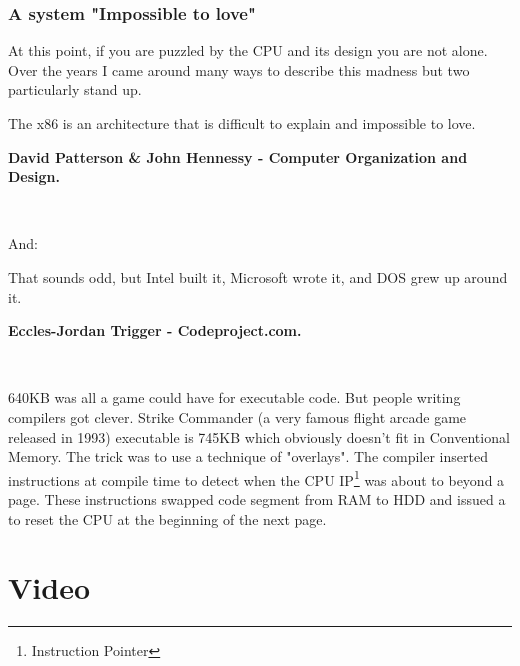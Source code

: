 \documentclass[book.tex]{subfiles}
\begin{document}
\subsubsection{A system "Impossible to love"}
At this point, if you are puzzled by the CPU and its design you are not alone. Over the years I came around many ways to describe this madness but two particularly stand up.\\
\par
 \begin{fancyquotes}
   The x86 is an architecture that is difficult to explain and impossible to love.\\
   \par
\textbf{David Patterson \& John Hennessy - Computer Organization and Design.}
 \end{fancyquotes}\\
\par
And:\\
\par
 \begin{fancyquotes}
    That sounds odd, but Intel built it, Microsoft wrote it, and DOS grew up around it.\\
   \par
\textbf{Eccles-Jordan Trigger - Codeproject.com.}
 \end{fancyquotes}\\



\par
{} 640KB was all a game could have for executable code. But people writing compilers got clever. Strike Commander (a very famous flight arcade game released in 1993) executable is 745KB which obviously doesn't fit in Conventional Memory. The trick was to use a technique of "overlays". The compiler inserted instructions at compile time to detect when the CPU IP\footnote{Instruction Pointer} was about to beyond a page. These instructions swapped code segment from RAM to HDD and issued a  to reset the CPU at the beginning of the next page.

















\section{Video}
\end{document}
